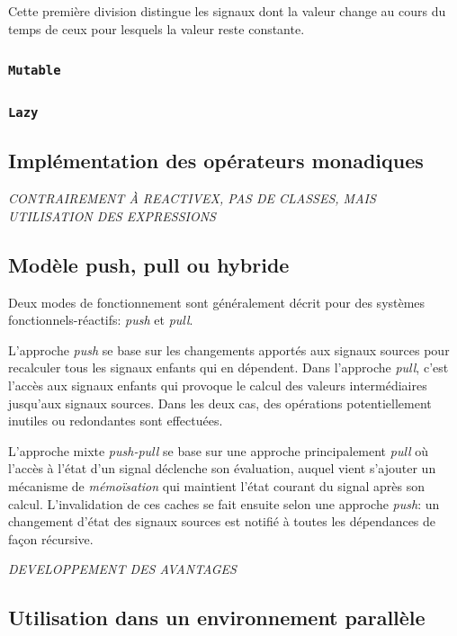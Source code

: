 Cette première division distingue les signaux dont la valeur change au cours du temps de ceux pour lesquels la valeur reste constante.

\subsubsection{\texttt{Mutable}}

\subsubsection{\texttt{Lazy}}

\subsection{Implémentation des opérateurs monadiques}

\textit{CONTRAIREMENT À REACTIVEX, PAS DE CLASSES, MAIS UTILISATION DES EXPRESSIONS}

\subsection{Modèle push, pull ou hybride}

Deux modes de fonctionnement sont généralement décrit pour des systèmes fonctionnels-réactifs: \emph{push} et \emph{pull}.

L'approche \emph{push} se base sur les changements apportés aux signaux sources pour recalculer tous les signaux enfants qui en dépendent. Dans l'approche \emph{pull}, c'est l'accès aux signaux enfants qui provoque le calcul des valeurs intermédiaires jusqu'aux signaux sources. Dans les deux cas, des opérations potentiellement inutiles ou redondantes sont effectuées.

L'approche mixte \emph{push-pull} se base sur une approche principalement \emph{pull} où l'accès à l'état d'un signal déclenche son évaluation, auquel vient s'ajouter un mécanisme de \emph{mémoïsation} qui maintient l'état courant du signal après son calcul. L'invalidation de ces caches se fait ensuite selon une approche \emph{push}: un changement d'état des signaux sources est notifié à toutes les dépendances de façon récursive.

\textit{DEVELOPPEMENT DES AVANTAGES}

\subsection{Utilisation dans un environnement parallèle}

